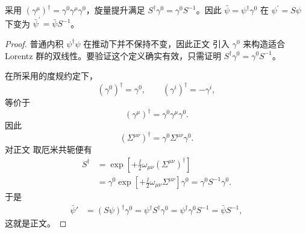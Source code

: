\begin{proposition}
采用 $(\gamma^\mu)^\dagger=\gamma^0\gamma^\mu\gamma^0$，旋量提升满足 $S^\dagger\gamma^0=\gamma^0S^{-1}$。因此 $\bar\psi=\psi^\dagger\gamma^0$ 在 $\psi^\prime=S\psi$ 下变为 $\bar\psi^\prime=\bar\psi S^{-1}$。
\end{proposition}
\begin{proof}
普通内积 $\psi^\dagger\psi$ 在推动下并不保持不变，因此正文 引入 $\gamma^0$ 来构造适合 Lorentz 群的双线性。要验证这个定义确实有效，只需证明 $S^\dagger\gamma^0=\gamma^0S^{-1}$。

在所采用的度规约定下，
\begin{equation*}
 (\gamma^0)^\dagger=\gamma^0,
 \qquad
 (\gamma^i)^\dagger=-\gamma^i,
\end{equation*}
等价于
\begin{equation*}
 (\gamma^\mu)^\dagger=\gamma^0\gamma^\mu\gamma^0.
\end{equation*}
因此
\begin{equation*}
 (\Sigma^{\mu\nu})^\dagger=\gamma^0\Sigma^{\mu\nu}\gamma^0.
\end{equation*}
对正文 取厄米共轭便有
\begin{align*}
 S^\dagger
 &=\exp\!\left[+\frac{\ii}{2}\omega_{\mu\nu}(\Sigma^{\mu\nu})^\dagger\right]\\
 &=\gamma^0\exp\!\left[+\frac{\ii}{2}\omega_{\mu\nu}\Sigma^{\mu\nu}\right]\gamma^0
 =\gamma^0S^{-1}\gamma^0.
\end{align*}
于是
\begin{align*}
 \bar\psi'
 &=(S\psi)^\dagger\gamma^0
 =\psi^\dagger S^\dagger\gamma^0
 =\psi^\dagger\gamma^0S^{-1}
 =\bar\psi S^{-1},
\end{align*}
这就是正文。
\end{proof}

